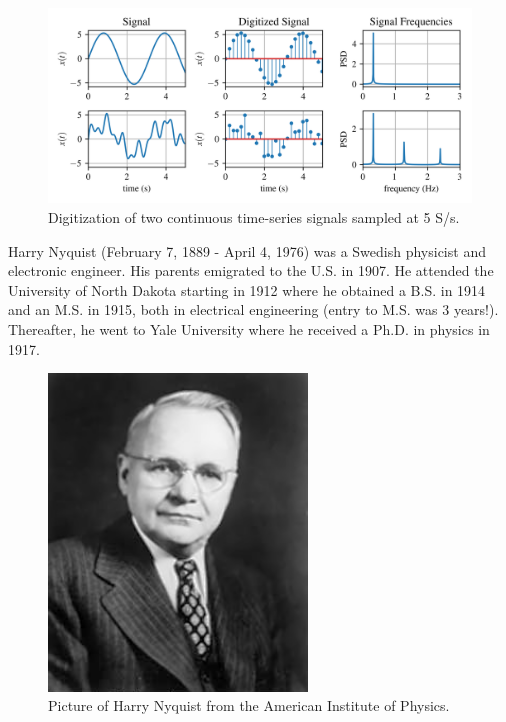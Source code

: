 \documentclass[12pt,letter]{article}
\begin{document}
\begin{figure}[H]
    \centering
    \includegraphics[width=6.5in]{../figures/signal_digitization.png}
    \caption{Digitization of two continuous time-series signals sampled at 5 S/s.}
    \label{fig:signal_digitization}
\end{figure}


	\begin{review}
	\label{sec:Harry_Nyquist}
		
		Harry Nyquist (February 7, 1889 - April 4, 1976) was a Swedish physicist and electronic engineer. His parents emigrated to the U.S. in 1907.  He attended the University of North Dakota starting in 1912 where he obtained a B.S. in 1914 and an M.S. in 1915, both in electrical engineering (entry to M.S. was 3 years!). Thereafter, he went to Yale University where he received a Ph.D. in physics in 1917.

		\begin{figure}[H]
			\centering
			\includegraphics[width=2.71in]{../figures/Harry_Nyquist.jpg}
			\caption{Picture of Harry Nyquist from the American Institute of Physics.\protect\footnotemark[1]}
			\label{fig:Harry_Nyquist}
		\end{figure}
	\end{review}
	
\end{document}
